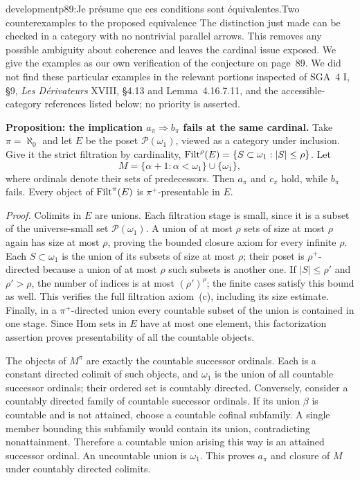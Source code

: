 \begin{dcomment}{development}{p89:Je présume que ces conditions sont équivalentes.}{Two counterexamples to the proposed equivalence}
The distinction just made can be checked in a category with no nontrivial parallel arrows. This removes any possible ambiguity about coherence and leaves the cardinal issue exposed. We give the examples as our own verification of the conjecture on page~89. We did not find these particular examples in the relevant portions inspected of SGA~4 I, \S9, \emph{Les D\'erivateurs} XVIII, \S4.13 and Lemma~4.16.7.11, and the accessible-category references listed below; no priority is asserted.

\textbf{Proposition: the implication $a_\pi\Rightarrow b_\pi$ fails at the same cardinal.}\ours
Take $\pi=\aleph_0$ and let $E$ be the poset $\mathcal P(\omega_1)$, viewed as a category under inclusion. Give it the strict filtration by cardinality, $\mathrm{Filt}^\rho(E)=\{S\subset\omega_1:|S|\leq\rho\}$. Let
\[
 M=\{\alpha+1:\alpha<\omega_1\}\cup\{\omega_1\},
\]
where ordinals denote their sets of predecessors. Then $a_\pi$ and $c_\pi$ hold, while $b_\pi$ fails. Every object of $\mathrm{Filt}^\pi(E)$ is $\pi^+$-presentable in $E$.

\emph{Proof.} Colimits in $E$ are unions. Each filtration stage is small, since it is a subset of the universe-small set $\mathcal P(\omega_1)$. A union of at most $\rho$ sets of size at most $\rho$ again has size at most $\rho$, proving the bounded closure axiom for every infinite $\rho$. Each $S\subset\omega_1$ is the union of its subsets of size at most $\rho$; their poset is $\rho^+$-directed because a union of at most $\rho$ such subsets is another one. If $|S|\leq\rho'$ and $\rho'>\rho$, the number of indices is at most $(\rho')^\rho$; the finite cases satisfy this bound as well. This verifies the full filtration axiom~(c), including its size estimate. Finally, in a $\pi^+$-directed union every countable subset of the union is contained in one stage. Since Hom sets in $E$ have at most one element, this factorization assertion proves presentability of all the countable objects.

The objects of $M^\pi$ are exactly the countable successor ordinals. Each is a constant directed colimit of such objects, and $\omega_1$ is the union of all countable successor ordinals; their ordered set is countably directed. Conversely, consider a countably directed family of countable successor ordinals. If its union $\beta$ is countable and is not attained, choose a countable cofinal subfamily. A single member bounding this subfamily would contain its union, contradicting nonattainment. Therefore a countable union arising this way is an attained successor ordinal. An uncountable union is $\omega_1$. This proves $a_\pi$ and closure of $M$ under countably directed colimits.


\end{dcomment}
